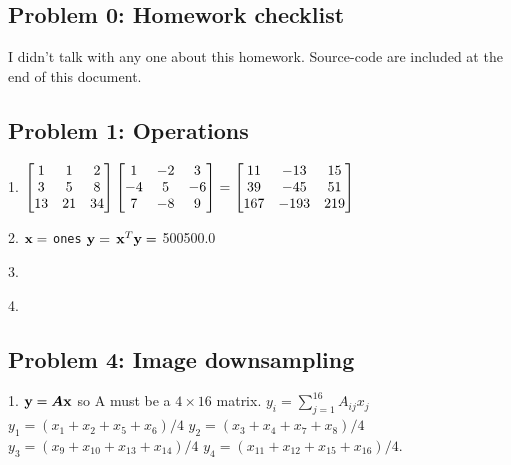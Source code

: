\documentclass{article}
\begin{document}
 



\hypertarget{problem_0_homework_checklist_2}{}\subsection*{{Problem 0: Homework checklist}}\label{problem_0_homework_checklist_2}

\checkmark	I didn't talk with any one about this homework. \newline
\checkmark 	Source-code are included at the end of this document. 


\hypertarget{problem_1_operations_3}{}\subsection*{{Problem 1: Operations}}\label{problem_1_operations_3}



1. $\begin{bmatrix}  1 & 1 & 2 \\ 3 & 5 & 8 \\ 13 & 21 & 34  \end{bmatrix} \begin{bmatrix}  1 & -2 & 3 \\ -4 & 5 & -6 \\ 7 & -8 & 9 \end{bmatrix} =\begin{bmatrix} 11 & -13 & 15 \\ 39 & -45 & 51 \\ 167 & -193 & 219 \end{bmatrix}$ \newline

2. $\boldsymbol{\mathrm{x}} =$ {\colorbox[rgb]{1.00,0.93,1.00}{\tt ones}} $\boldsymbol{\mathrm{y}} =$ {\colorbox[rgb]{1.00,0.93,1.00}{\tt {}}} $\boldsymbol{\mathrm{x}}^T \boldsymbol{\mathrm{y}} =$ 500500.0 \newline

3. 

4. 


\hypertarget{problem_4_image_downsampling_6}{}\subsection*{{Problem 4: Image downsampling}}\label{problem_4_image_downsampling_6}

1.%
$\boldsymbol{\mathrm{y}} = \boldsymbol{A}\boldsymbol{\mathrm{x}} $
so A must be a $4\times 16$ matrix.  $ y_i= \sum_{j=1}^{16}A_{ij}x_j  $ \\
$ y_1 = (x_1 + x_2 + x_5 + x_6)/4 $ \newline
$ y_2 = (x_3 + x_4 + x_7 + x_8)/4   $ \newline
$ y_3 = (x_9 + x_{10} + x_{13} + x_{14})/4 $ \newline
$ y_4 = (x_{11} + x_{12} + x_{15} + x_{16})/4.$ \newline
\end{document}
